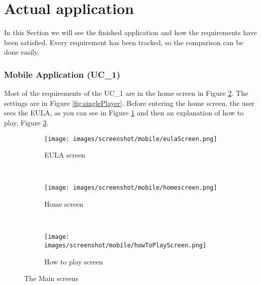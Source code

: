 \newpage

\section{Actual application}
\label{sec:actualApplication}

In this Section we will see the finished application and how the requirements have been satisfied. Every requirement has been tracked, so the comparison can be done easily.  

\subsubsection{Mobile Application (UC\_1)}

Most of the requirements of the UC\_1 are in the home screen in Figure \ref{fig:homescreen}. The settings are in Figure \ref{fig:singlePlayer}. Before entering the home screen, the user sees the EULA, as you can see in Figure \ref{fig:eulaScreen} and then an explanation of how to play, Figure \ref{fig:howToPlay}.

\begin{figure}[H]
        \begin{subfigure}[b]{0.3\textwidth}
                \centering
\texttt{[image: images/screenshot/mobile/eulaScreen.png]}
\caption{EULA screen}
\label{fig:eulaScreen}
        \end{subfigure}%
        ~ %
        \begin{subfigure}[b]{0.3\textwidth}
                \centering
\texttt{[image: images/screenshot/mobile/homescreen.png]}
\caption{Home screen}
\label{fig:homescreen}
        \end{subfigure}
        ~ %
        \begin{subfigure}[b]{0.3\textwidth}
                \centering
\texttt{[image: images/screenshot/mobile/howToPlayScreen.png]}
\caption{How to play screen}
\label{fig:howToPlay}
        \end{subfigure}
        \caption{The Main screens}
        \label{fig:mainScreens}
\end{figure}

